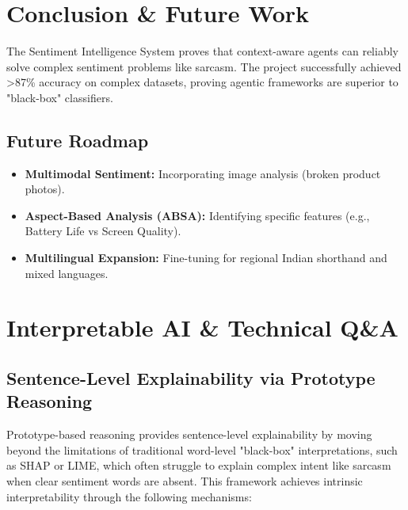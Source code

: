 \documentclass[11pt,oneside]{scrbook}
\begin{document}
\cleardoublepage
\chapter{Conclusion \& Future Work}
The Sentiment Intelligence System proves that context-aware agents can reliably solve complex sentiment problems like sarcasm. The project successfully achieved >87\% accuracy on complex datasets, proving agentic frameworks are superior to "black-box" classifiers.

\section{Future Roadmap}
\begin{itemize}
    \item \textbf{Multimodal Sentiment:} Incorporating image analysis (broken product photos).
    \item \textbf{Aspect-Based Analysis (ABSA):} Identifying specific features (e.g., Battery Life vs Screen Quality).
    \item \textbf{Multilingual Expansion:} Fine-tuning for regional Indian shorthand and mixed languages.
\end{itemize}

\appendix
\chapter{Interpretable AI \& Technical Q\&A}

\section{Sentence-Level Explainability via Prototype Reasoning}
Prototype-based reasoning provides sentence-level explainability by moving beyond the limitations of traditional word-level "black-box" interpretations, such as SHAP or LIME, which often struggle to explain complex intent like sarcasm when clear sentiment words are absent. This framework achieves intrinsic interpretability through the following mechanisms:
\end{document}
